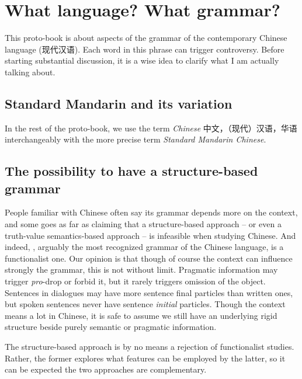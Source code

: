 \documentclass[../main.tex]{subfiles}
\begin{document}
\section{What language? What grammar?}

This proto-book is about aspects of the grammar of the contemporary Chinese language (现代汉语). 
Each word in this phrase can trigger controversy. Before starting substantial discussion, it is a wise idea 
to clarify what I am actually talking about. 

\subsection{Standard Mandarin and its variation}


In the rest of the proto-book, we use the term \emph{Chinese} 中文，（现代）汉语，华语 interchangeably with 
the more precise term \emph{Standard Mandarin Chinese}.

\subsection{The possibility to have a structure-based grammar}\label{sec:structure-based}

People familiar with Chinese often say its grammar depends more on the context, and some goes as far as 
claiming that a structure-based approach -- or even a truth-value semantics-based approach -- is infeasible 
when studying Chinese. And indeed, \citet{li1989mandarin}, arguably the most recognized grammar of the Chinese 
language, is a functionalist one. Our opinion is that though of course the context can influence strongly the 
grammar, this is not without limit. Pragmatic information may trigger \emph{pro}-drop or forbid it, but it 
rarely triggers omission of the object. Sentences in dialogues may have more sentence final particles than 
written ones, but spoken sentences never have sentence \emph{initial} particles. Though the context means 
a lot in Chinese, it is safe to assume we still have an underlying rigid structure beside purely semantic 
or pragmatic information.

The structure-based approach is by no means a rejection of functionalist studies. Rather, the former explores 
what features can be employed by the latter, so it can be expected the two approaches are complementary.
\end{document}
